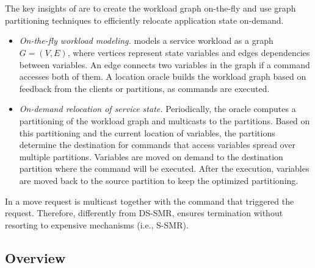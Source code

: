 \section{\dynastar}
\label{sec:dynastar}

The key insights of \dynastar are to create the workload graph on-the-fly and use graph partitioning techniques to efficiently relocate application state on-demand.
\begin{itemize}
\item \emph{On-the-fly workload modeling.}
\dynastar models a service workload as a graph $G = (V, E)$, where vertices represent state variables and edges dependencies between variables.
An edge connects two variables in the graph if a command accesses both of them.
A location oracle builds the workload graph based on feedback from the clients or partitions, as commands are executed.
\item \emph{On-demand relocation of service state.}
Periodically, the oracle computes a partitioning of the workload graph and multicasts to the partitions.
Based on this partitioning and the current location of variables, the partitions determine the destination for commands that access variables spread over multiple partitions.
Variables are moved on demand to the destination partition where the command will be executed. After the execution, variables are moved back to the source partition to keep the optimized partitioning.
\end{itemize}

In \dynastar a move request is multicast together with the command that triggered the request.
Therefore, differently from DS-SMR, \dynastar ensures termination without resorting to expensive mechanisms (i.e., S-SMR).

\subsection{Overview}



